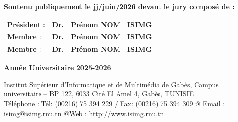 \begin{titlepage}
{\fontsize{12}{14}\selectfont\bfseries
Soutenu publiquement le jj/juin/2026 devant le jury composé de :\par}
\vspace{0.12cm}

\renewcommand{\arraystretch}{1.18}
\begin{tabular}{L{3.3cm}L{4.9cm}L{5.0cm}r}
    \textbf{Président :} & \textbf{Dr.} & \textbf{Prénom NOM} & \textbf{ISIMG} \\
    \textbf{Membre :} & \textbf{Dr.} & \textbf{Prénom NOM} & \textbf{ISIMG} \\
    \textbf{Membre :} & \textbf{Dr.} & \textbf{Prénom NOM} & \textbf{ISIMG} \\
\end{tabular}

\vfill

{\fontsize{12}{14}\selectfont\bfseries Année Universitaire 2025-2026\par}
\vspace{0.16cm}
{\fontsize{6.8}{8.2}\selectfont
Institut Supérieur d'Informatique et de Multimédia de Gabès, Campus universitaire -- BP 122, 6033 Cité El Amel 4, Gabès, TUNISIE\\
Téléphone : Tél: (00216) 75 394 229 / Fax: (00216) 75 394 309 @ Email : isimg@isimg.rnu.tn @Web : http://www.isimg.rnu.tn\par}

\endgroup
\restoregeometry
\end{titlepage}
